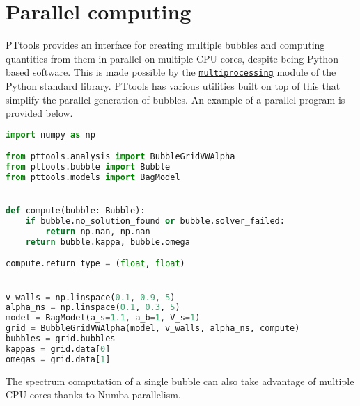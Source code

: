 \section{Parallel computing}
PTtools provides an interface for creating multiple bubbles and computing quantities from them in parallel on multiple CPU cores,
despite being Python-based software.
This is made possible by the
\href{https://docs.python.org/3/library/multiprocessing.html}{\texttt{multiprocessing}}
module of the Python standard library.
PTtools has various utilities built on top of this that simplify the parallel generation of bubbles.
An example of a parallel program is provided below.

\begin{lstlisting}[language=Python]
import numpy as np

from pttools.analysis import BubbleGridVWAlpha
from pttools.bubble import Bubble
from pttools.models import BagModel


def compute(bubble: Bubble):
	if bubble.no_solution_found or bubble.solver_failed:
		return np.nan, np.nan
	return bubble.kappa, bubble.omega

compute.return_type = (float, float)


v_walls = np.linspace(0.1, 0.9, 5)
alpha_ns = np.linspace(0.1, 0.3, 5)
model = BagModel(a_s=1.1, a_b=1, V_s=1)
grid = BubbleGridVWAlpha(model, v_walls, alpha_ns, compute)
bubbles = grid.bubbles
kappas = grid.data[0]
omegas = grid.data[1]
\end{lstlisting}

The spectrum computation of a single bubble can also take advantage of multiple CPU cores thanks to Numba parallelism.
